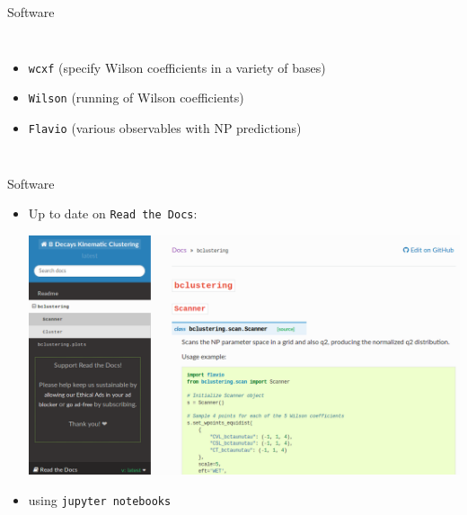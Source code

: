 \begin{frame}{Software}
\begin{columns}
\begin{itemize}
	    	\item {} \texttt{wcxf} {\footnotesize(specify Wilson coefficients in a variety of bases)}
	    	\item {} \texttt{Wilson} {\footnotesize(running of Wilson coefficients)}
	    	\item {} \texttt{Flavio} {\footnotesize(various observables with NP predictions)}
	    \end{itemize}
	 \end{columns}
\end{frame}

\begin{frame}{Software}
    \begin{itemize}
        \item Up to date  on  \texttt{Read the Docs}:\\[3ex]
        \begin{center}\includegraphics[width=0.8\linewidth]{figures/scrot/readthedocs.png}\end{center}
        \vspace{2ex}
        \item {} using  \texttt{jupyter notebooks}
    \end{itemize}
    
    \bigskip
    
\end{frame}

